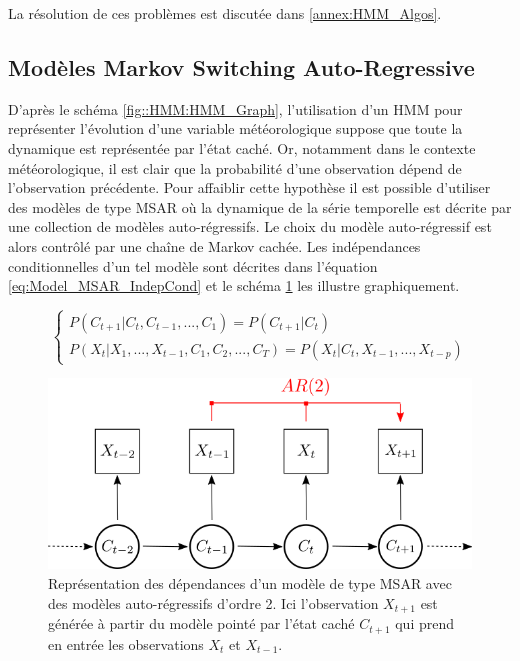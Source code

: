 \documentclass[12pt, french]{report}
\begin{document}
La résolution de ces problèmes est discutée dans \ref{annex:HMM_Algos}.


\subsection{Modèles Markov Switching Auto-Regressive}
\label{subsec:Modeles_MSAR}
D'après le schéma \ref{fig::HMM:HMM_Graph}, l'utilisation d'un HMM pour représenter l'évolution d'une variable météorologique suppose que toute la dynamique est représentée par l'état caché. Or, notamment dans le contexte météorologique, il est clair que la probabilité d'une observation dépend de l'observation précédente. Pour affaiblir cette hypothèse il est possible d'utiliser des modèles de type MSAR où la dynamique de la série temporelle est décrite par une collection de modèles auto-régressifs. Le choix du modèle auto-régressif est alors contrôlé par une chaîne de Markov cachée. Les indépendances conditionnelles d'un tel modèle sont décrites dans l'équation \eqref{eq:Model_MSAR_IndepCond} et le schéma \ref{fig::HMM:MSAR} les illustre graphiquement.

\begin{equation}
\begin{cases}
P\left( C_{t+1} | C_t,C_{t-1},...,C_1  \right) = P\left( C_{t+1} | C_t  \right) \\
P\left( X_t | X_1,...,X_{t-1} , C_1,C_2,...,C_T \right)   = P(X_t | C_t, X_{t-1},...,X_{t-p})
\end{cases}
\label{eq:Model_MSAR_IndepCond}
\end{equation}


\begin{figure}[htbp]
	\begin{center}
		\includegraphics[width=0.6 \textwidth]{Images/Models/HMM/MSAR.png}
		\caption{Représentation des dépendances d'un modèle de type MSAR avec des modèles auto-régressifs d'ordre 2. Ici l'observation $X_{t+1}$ est générée à partir du modèle pointé par l'état caché $C_{t+1}$ qui prend en entrée les observations $X_t$ et $X_{t-1}$.}
		\label{fig::HMM:MSAR}
	\end{center}
\end{figure}
\end{document}
